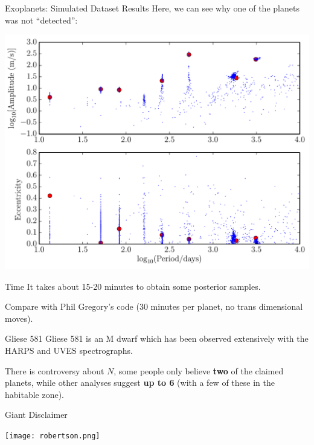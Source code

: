 \begin{frame}[t]{Exoplanets: Simulated Dataset Results}
Here, we can see why one of the planets was not ``detected'':
\begin{center}
\includegraphics[scale=0.35]{ExoplanetFigures/fake_data_posterior.pdf}
\end{center}
\end{frame}

\begin{frame}[t]{Time}
It takes about 15-20 minutes to obtain some posterior samples.

Compare with Phil Gregory's code (30 minutes per planet, no trans dimensional
moves).
\end{frame}

\begin{frame}[t]{Gliese 581}
Gliese 581 is an M dwarf which has been observed extensively with the HARPS
and UVES spectrographs.

\vspace{20pt}

There is controversy about $N$, some people only
believe {\bf two} of the claimed planets, while other analyses suggest
{\bf up to 6} (with a few of these in the habitable zone).
\end{frame}

\begin{frame}[t]{Giant Disclaimer}
\begin{center}
\texttt{[image: robertson.png]}
\end{center}
\end{frame}

